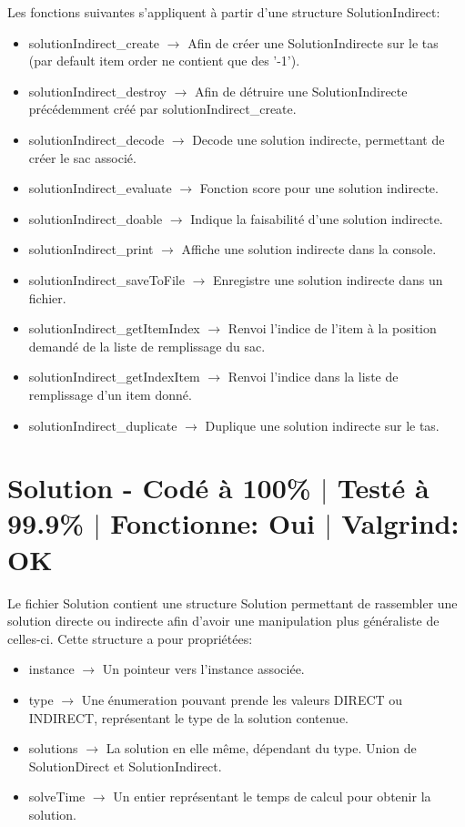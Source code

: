 \documentclass{EPUProjetPeiP}
\newcommand{\comp}[5]{
	\section[#1]{#1 {\small - Codé à #2\% $\vert$ Testé à #3\% $\vert$ Fonctionne: #4 $\vert$ Valgrind: #5}}
}
\begin{document}
Les fonctions suivantes s'appliquent à partir d'une structure SolutionIndirect:
\begin{itemize}
	\item solutionIndirect\_create $\longrightarrow$ Afin de créer une SolutionIndirecte sur le tas (par default item order ne contient que des '-1').
	\item solutionIndirect\_destroy $\longrightarrow$ Afin de détruire une SolutionIndirecte précédemment créé par solutionIndirect\_create.
	\item solutionIndirect\_decode $\longrightarrow$ Decode une solution indirecte, permettant de créer le sac associé.
	\item solutionIndirect\_evaluate $\longrightarrow$ Fonction score pour une solution indirecte.
	\item solutionIndirect\_doable $\longrightarrow$ Indique la faisabilité d'une solution indirecte.
	\item solutionIndirect\_print $\longrightarrow$ Affiche une solution indirecte dans la console.
	\item solutionIndirect\_saveToFile $\longrightarrow$ Enregistre une solution indirecte dans un fichier.
	\item solutionIndirect\_getItemIndex $\longrightarrow$ Renvoi l'indice de l'item à la position demandé de la liste de remplissage du sac.
	\item solutionIndirect\_getIndexItem $\longrightarrow$ Renvoi l'indice dans la liste de remplissage d'un item donné.
	\item solutionIndirect\_duplicate $\longrightarrow$ Duplique une solution indirecte sur le tas.
\end{itemize}

\comp{Solution}{100}{99.9}{Oui}{OK}
Le fichier Solution contient une structure Solution permettant de rassembler une solution directe ou indirecte afin d'avoir une manipulation plus généraliste de celles-ci. Cette structure a pour propriétées:
\begin{itemize}
	\item instance $\longrightarrow$ Un pointeur vers l'instance associée.
	\item type $\longrightarrow$ Une énumeration pouvant prende les valeurs DIRECT ou INDIRECT, représentant le type de la solution contenue.
	\item solutions $\longrightarrow$ La solution en elle même, dépendant du type. Union de SolutionDirect et SolutionIndirect.
	\item solveTime $\longrightarrow$ Un entier représentant le temps de calcul pour obtenir la solution.\\
\end{itemize}
\end{document}
